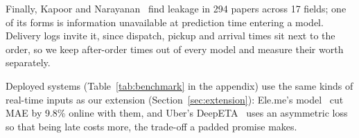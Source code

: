 Finally, Kapoor and Narayanan~\cite{kapoor2023leakage} find leakage in 294 papers across 17 fields; one
of its forms is information unavailable at prediction time entering a model. Delivery logs invite it,
since dispatch, pickup and arrival times sit next to the order, so we keep after-order times out of every
model and measure their worth separately.

Deployed systems (Table~\ref{tab:benchmark} in the appendix) use the same kinds of real-time inputs as
our extension (Section~\ref{sec:extension}): Ele.me's model~\cite{zhu2020fulfillment,alibaba2020fulfillment}
cut MAE by 9.8\% online with them, and Uber's DeepETA~\cite{uber2022deepeta,hu2022deepreta} uses an
asymmetric loss so that being late costs more, the trade-off a padded promise makes.
